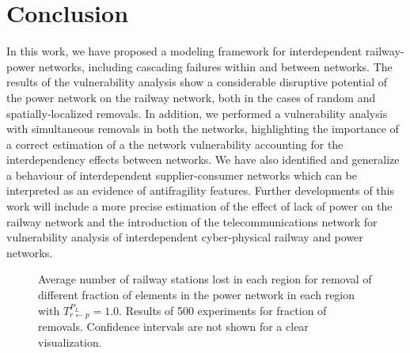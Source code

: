 \documentclass[review]{elsarticle}
\begin{document}
\section{Conclusion}
In this work, we have proposed a modeling framework for interdependent railway-power networks, including cascading failures within and between networks. The results of the vulnerability analysis show a considerable disruptive potential of the power network on the railway network, both in the cases of random and spatially-localized removals. In addition, we performed a vulnerability analysis with simultaneous removals in both the networks, highlighting the importance of a correct estimation of a the network vulnerability accounting for the interdependency effects between networks. We have also identified and generalize a behaviour of interdependent supplier-consumer networks which can be interpreted as an evidence of antifragility features. Further developments of this work will include a more precise estimation of the effect of lack of power on the railway network and the introduction of the telecommunications network for vulnerability analysis of interdependent cyber-physical railway and power networks.

	\begin{figure}[h]
	\centering
	\caption{Average number of railway stations lost in each region for removal of different fraction of elements in the power network in each region with $T_{r \leftarrow p}^{P_L}=1.0$. Results of 500 experiments for fraction of removals. Confidence intervals are not shown for a clear visualization.}
	\label{regions_tp100}
\end{figure}
\end{document}
